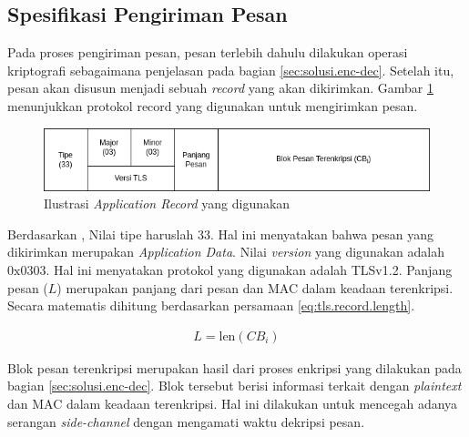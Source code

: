 \subsection{Spesifikasi Pengiriman Pesan}

Pada proses pengiriman pesan, pesan terlebih dahulu dilakukan operasi kriptografi sebagaimana penjelasan pada bagian \ref{sec:solusi.enc-dec}. Setelah itu, pesan akan disusun menjadi sebuah \emph{record} yang akan dikirimkan. Gambar \ref{fig:tls.application.rec} menunjukkan protokol record yang digunakan untuk mengirimkan pesan.

\begin{figure}[!h]
  \centering
  \includegraphics[width=\textwidth]{chapters/res/chapter-3/img/tls.application.record.png}
  \caption{Ilustrasi \emph{Application Record} yang digunakan} \label{fig:tls.application.rec}
\end{figure}

Berdasarkan \textcite{rfc5246}, Nilai tipe haruslah 33. Hal ini menyatakan bahwa pesan yang dikirimkan merupakan \emph{Application Data}. Nilai \emph{version} yang digunakan adalah $\text{0x0303}$. Hal ini menyatakan protokol yang digunakan adalah TLSv1.2. Panjang pesan ($L$) merupakan panjang dari pesan dan MAC dalam keadaan terenkripsi. Secara matematis dihitung berdasarkan persamaan \ref{eq:tls.record.length}.

\begin{equation}
  \begin{aligned}
    L = \text{len}(CB_{i})
  \end{aligned}
  \label{eq:tls.record.length}
\end{equation}

Blok pesan terenkripsi merupakan hasil dari proses enkripsi yang dilakukan pada bagian \ref{sec:solusi.enc-dec}. Blok tersebut berisi informasi terkait dengan \emph{plaintext} dan MAC dalam keadaan terenkripsi. Hal ini dilakukan untuk mencegah adanya serangan \emph{side-channel} dengan mengamati waktu dekripsi pesan.
